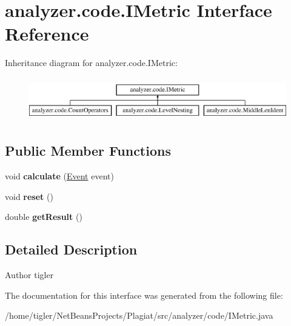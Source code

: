 \hypertarget{interfaceanalyzer_1_1code_1_1IMetric}{}\section{analyzer.\+code.\+I\+Metric Interface Reference}
\label{interfaceanalyzer_1_1code_1_1IMetric}
Inheritance diagram for analyzer.\+code.\+I\+Metric\+:\begin{figure}[H]
\begin{center}
\leavevmode
\includegraphics[height=1.914530cm]{interfaceanalyzer_1_1code_1_1IMetric}
\end{center}
\end{figure}
\subsection*{Public Member Functions}
\begin{DoxyCompactItemize}
\item 
\mbox{\label{interfaceanalyzer_1_1code_1_1IMetric_af282cdf9099b9c71af2b3ba1ef678d39}} 
void {\bfseries calculate} (\hyperlink{classanalyzer_1_1code_1_1Event}{Event} event)
\item 
\mbox{\label{interfaceanalyzer_1_1code_1_1IMetric_a86779b844f595f60a13e51946c57b4db}} 
void {\bfseries reset} ()
\item 
\mbox{\label{interfaceanalyzer_1_1code_1_1IMetric_a43d08f765fbc75476186d2d3a576fe99}} 
double {\bfseries get\+Result} ()
\end{DoxyCompactItemize}


\subsection{Detailed Description}
\begin{DoxyAuthor}{Author}
tigler 
\end{DoxyAuthor}


The documentation for this interface was generated from the following file\+:\begin{DoxyCompactItemize}
\item 
/home/tigler/\+Net\+Beans\+Projects/\+Plagiat/src/analyzer/code/I\+Metric.\+java\end{DoxyCompactItemize}
